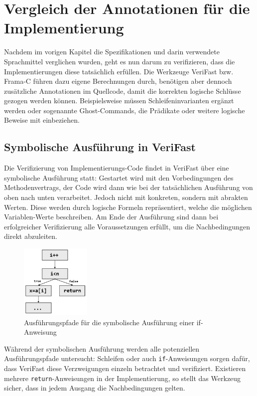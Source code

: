 ﻿\chapter{Vergleich der Annotationen für die Implementierung}

Nachdem im vorigen Kapitel die Spezifikationen und darin verwendete Sprachmittel verglichen wurden,
geht es nun darum zu verifizieren, dass die Implementierungen diese tatsächlich erfüllen.
Die Werkzeuge VeriFast bzw. Frama-C führen dazu eigene Berechnungen durch, benötigen aber dennoch
zusätzliche Annotationen im Quellcode, damit die korrekten logische Schlüsse gezogen 
werden können. Beispielsweise müssen Schleifeninvarianten ergänzt werden oder sogenannte
Ghost-Commands, die Prädikate oder weitere logische Beweise mit einbeziehen.

\section{Symbolische Ausführung in VeriFast}

Die Verifizierung von Implementierungs-Code findet in VeriFast über eine symbolische Ausführung statt:
Gestartet wird mit den Vorbedingungen des Methodenvertrags, der Code wird dann wie bei der tatsächlichen
Ausführung von oben nach unten verarbeitet. Jedoch nicht mit konkreten, sondern mit 
abrakten Werten. Diese werden durch logische Formeln repräsentiert, welche die möglichen Variablen-Werte 
beschreiben. Am Ende der Ausführung sind dann bei erfolgreicher Verifizierung alle Voraussetzungen
erfüllt, um die Nachbedingungen direkt abzuleiten.

\begin{figure}
	\centering
		\includegraphics[width=0.3\textwidth]{images/symbolic_execution.png}
		\caption{Ausführungspfade für die symbolische Ausführung einer if-Anweisung}
\end{figure}

Während der symbolischen Ausführung werden alle potenziellen Ausführungspfade untersucht: Schleifen
oder auch \texttt{if}-Anweisungen sorgen dafür, dass VeriFast diese Verzweigungen einzeln betrachtet
und verifiziert. Existieren mehrere \texttt{return}-Anweisungen in der Implementierung, so stellt
das Werkzeug sicher, dass in jedem Ausgang die Nachbedingungen gelten.

